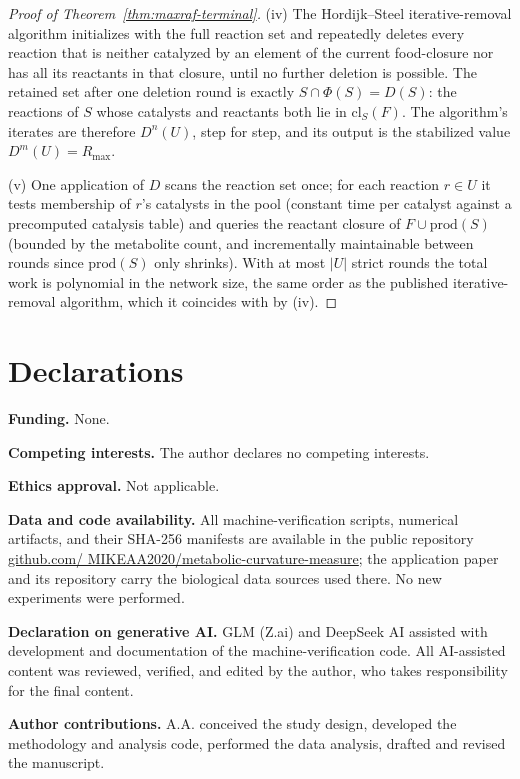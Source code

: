 \documentclass[11pt,a4paper]{article}
\theoremstyle{plain}
\theoremstyle{definition}
\theoremstyle{remark}
\begin{document}
\begin{proof}[Proof of Theorem~\ref{thm:maxraf-terminal}]
(iv) The Hordijk--Steel iterative-removal algorithm initializes
with the full reaction set and repeatedly deletes every reaction
that is neither catalyzed by an element of the current food-closure
nor has all its reactants in that closure, until no further
deletion is possible. The retained set after one deletion round is
exactly $S\cap\Phi(S)=D(S)$: the reactions of $S$ whose catalysts
and reactants both lie in $\mathrm{cl}_{S}(F)$. The algorithm's iterates are therefore
$D^{n}(U)$, step for step, and its output is the stabilized
value $D^{m}(U)=R_{\max}$.

(v) One application of $D$ scans the reaction set once; for each
reaction $r\in U$ it tests membership of $r$'s catalysts in the
pool (constant time per catalyst against a precomputed catalysis
table) and queries the reactant closure of
$F\cup\mathrm{prod}(S)$ (bounded by the metabolite count, and
incrementally maintainable between rounds since
$\mathrm{prod}(S)$ only shrinks). With at most $|U|$ strict
rounds the total work is polynomial in the network size, the same
order as the published iterative-removal algorithm, which it
coincides with by (iv).
\end{proof}

\section*{Declarations}
\noindent\textbf{Funding.} None.

\smallskip
\noindent\textbf{Competing interests.} The author declares no
competing interests.

\smallskip
\noindent\textbf{Ethics approval.} Not applicable.

\smallskip
\noindent\textbf{Data and code availability.} All
machine-verification scripts, numerical artifacts, and their SHA-256
manifests are available in the public repository
\href{https://github.com/MIKEAA2020/metabolic-curvature-measure}{github.com/
MIKEAA2020/metabolic-curvature-measure}; the application paper
\citep{zai2026measure} and its repository carry the biological data
sources used there. No new experiments were performed.

\smallskip
\noindent\textbf{Declaration on generative AI.} GLM (Z.ai) and
DeepSeek AI assisted with development and documentation of the
machine-verification code. All AI-assisted content was reviewed,
verified, and edited by the author, who takes responsibility for the
final content.

\smallskip
\noindent\textbf{Author contributions.} A.A. conceived the study
design, developed the methodology and analysis code, performed the
data analysis, drafted and revised the manuscript.



\end{document}
